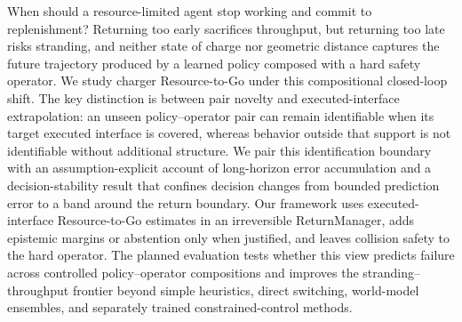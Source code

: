 When should a resource-limited agent stop working and commit to replenishment? Returning too early sacrifices throughput, but returning too late risks stranding, and neither state of charge nor geometric distance captures the future trajectory produced by a learned policy composed with a hard safety operator. We study charger Resource-to-Go under this compositional closed-loop shift. The key distinction is between pair novelty and executed-interface extrapolation: an unseen policy--operator pair can remain identifiable when its target executed interface is covered, whereas behavior outside that support is not identifiable without additional structure. We pair this identification boundary with an assumption-explicit account of long-horizon error accumulation and a decision-stability result that confines decision changes from bounded prediction error to a band around the return boundary. Our framework uses executed-interface Resource-to-Go estimates in an irreversible ReturnManager, adds epistemic margins or abstention only when justified, and leaves collision safety to the hard operator.  The planned evaluation tests whether this view predicts failure across controlled policy--operator compositions and improves the stranding--throughput frontier beyond simple heuristics, direct switching, world-model ensembles, and separately trained constrained-control methods.
